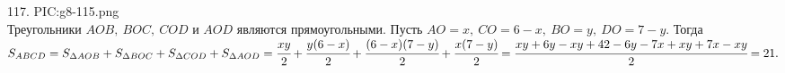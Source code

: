 117. {{PIC:g8-115.png}}\\
Треугольники $AOB,\ BOC,\ COD$ и $AOD$ являются прямоугольными. Пусть $AO=x,\ CO=6-x,\ BO=y,\ DO=7-y.$ Тогда $S_{ABCD}=S_{\Delta AOB}+S_{\Delta BOC}+S_{\Delta COD}+S_{\Delta AOD}=\cfrac{xy}{2}+\cfrac{y(6-x)}{2}+\cfrac{(6-x)(7-y)}{2}+\cfrac{x(7-y)}{2}=\cfrac{xy+6y-xy+42-6y-7x+xy+7x-xy}{2}=21.$\\
